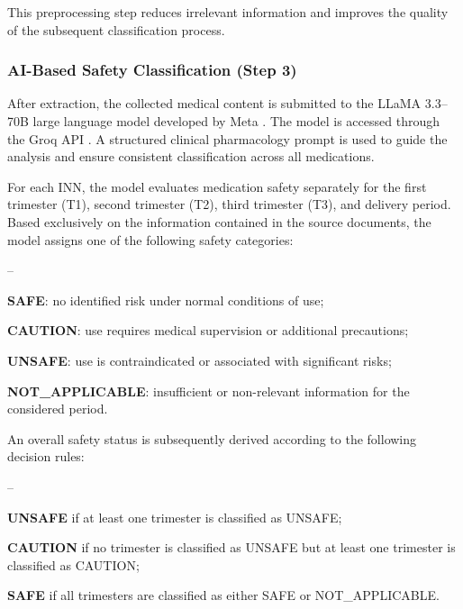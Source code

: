 This preprocessing step reduces irrelevant information and improves the quality of the subsequent classification process.

\subsubsection{AI-Based Safety Classification (Step 3)}

After extraction, the collected medical content is submitted to the LLaMA 3.3--70B large language model developed by Meta \cite{llama33}. The model is accessed through the Groq API \cite{groq}. A structured clinical pharmacology prompt is used to guide the analysis and ensure consistent classification across all medications.

For each INN, the model evaluates medication safety separately for the first trimester (T1), second trimester (T2), third trimester (T3), and delivery period. Based exclusively on the information contained in the source documents, the model assigns one of the following safety categories:

\begin{list}{--}{}
 \setlength\itemsep{-0.5em}
    \item \textbf{SAFE}: no identified risk under normal conditions of use;
    \item \textbf{CAUTION}: use requires medical supervision or additional precautions;
    \item \textbf{UNSAFE}: use is contraindicated or associated with significant risks;
    \item \textbf{NOT\_APPLICABLE}: insufficient or non-relevant information for the considered period.
\end{list}

An overall safety status is subsequently derived according to the following decision rules:

\begin{list}{--}{}
 \setlength\itemsep{-0.5em}
    \item \textbf{UNSAFE} if at least one trimester is classified as UNSAFE;
    \item \textbf{CAUTION} if no trimester is classified as UNSAFE but at least one trimester is classified as CAUTION;
    \item \textbf{SAFE} if all trimesters are classified as either SAFE or NOT\_APPLICABLE.
\end{list}

